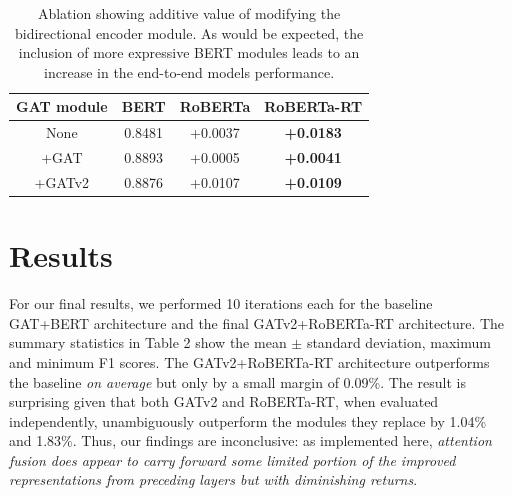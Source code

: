 \documentclass[letterpaper]{article} %
\begin{document}
\begin{table}
    \begin{tabular}{|c||c|c|c|}
        \hline
        GAT module & BERT & RoBERTa & RoBERTa-RT  \\
        \hline 
        \hline
        None & 0.8481 & +0.0037 &  \textbf{+0.0183}  \\
        +GAT & 0.8893 & +0.0005 & \textbf{+0.0041} \\
        +GATv2 & 0.8876 & +0.0107 & \textbf{+0.0109} \\
        \hline
    \end{tabular}
    \caption{Ablation showing additive value of modifying the bidirectional encoder module. As would be expected, the inclusion of more expressive BERT modules leads to an increase in the end-to-end models performance.}
\end{table}

\section{Results}

For our final results, we performed 10 iterations each for the baseline GAT+BERT architecture and the final GATv2+RoBERTa-RT architecture. The summary statistics in Table 2 show the mean $\pm$ standard deviation, maximum and minimum F1 scores. The GATv2+RoBERTa-RT architecture outperforms the baseline \textit{on average} but only by a small margin of 0.09\%. The result is surprising given that both GATv2 and RoBERTa-RT, when evaluated independently, unambiguously outperform the modules they replace by 1.04\% and 1.83\%. Thus, our findings are inconclusive: as implemented here, \textit{attention fusion does appear to carry forward some limited portion of the improved representations from preceding layers but with diminishing returns}. 

\end{document}
